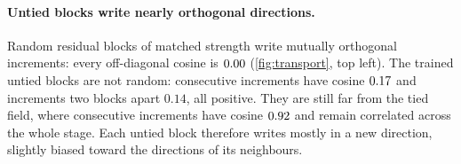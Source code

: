 \begin{table}[t]
    \centering
    \caption{Basis-independent transport statistics of stage~3, mean over $500$ images
    (std across images $\le 0.021$ for straightness and $\le 0.035$ for cosines).
    Str.: $\|x_T-x_0\|$ over path length (arc at $R{=}100$, chords at $R{=}1$);
    chords: $\|x_T-x_0\|$ over the sum of block chords;
    $\overline{\cos}$: mean off-diagonal cosine;
    $E$: opposed fraction; align: mean $\cos(\Delta x_k,x_T-x_0)$;
    $t_{50}$: first $t$ with $p(t)\ge 0.5$.}
    \label{tab:coherence}
    \scriptsize
    \setlength{\tabcolsep}{2.2pt}
\end{table}

\paragraph{Untied blocks write nearly orthogonal directions.}
Random residual blocks of matched strength write mutually orthogonal increments:
every off-diagonal cosine is $0.00$ (\cref{fig:transport}, top left).
The trained untied blocks are not random: consecutive increments have cosine
$0.17$ and increments two blocks apart $0.14$, all positive.
They are still far from the tied field, where consecutive increments have cosine
$0.92$ and remain correlated across the whole stage.
Each untied block therefore writes mostly in a new direction, slightly biased toward
the directions of its neighbours.

